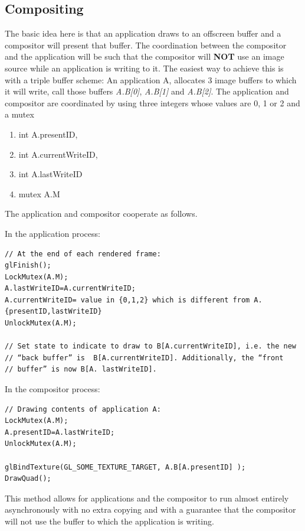 \documentclass[a4paper,11pt]{article}
\begin{document}
\subsection{Compositing}
\begin{indenter}{2cm}

The basic idea here is that an application draws to an offscreen buffer and a compositor will present that buffer. The coordination between the compositor and the application will be such that the compositor will \textbf{NOT} use an image source while an application is writing to it. The easiest way to achieve this is with a triple buffer scheme: An application A, allocates 3 image buffers to which it will write, call those buffers \textit{A.B[0]}, \textit{A.B[1]} and \textit{A.B[2]}. The application and compositor are coordinated by using three integers whose values are 0, 1 or 2 and a mutex
\begin{enumerate}
\item int A.presentID, 
\item int A.currentWriteID, 
\item int A.lastWriteID
\item mutex A.M
\end{enumerate}

The application and compositor cooperate as follows.

In the application process:
\begin{verbatim}
// At the end of each rendered frame:
glFinish();
LockMutex(A.M);
A.lastWriteID=A.currentWriteID;
A.currentWriteID= value in {0,1,2} which is different from A.{presentID,lastWriteID}
UnlockMutex(A.M);

// Set state to indicate to draw to B[A.currentWriteID], i.e. the new 
// “back buffer” is  B[A.currentWriteID]. Additionally, the “front 
// buffer” is now B[A. lastWriteID].
\end{verbatim}

In the compositor process:
\begin{verbatim}
// Drawing contents of application A:
LockMutex(A.M);
A.presentID=A.lastWriteID;
UnlockMutex(A.M);

glBindTexture(GL_SOME_TEXTURE_TARGET, A.B[A.presentID] );
DrawQuad();
\end{verbatim}
	
This method allows for applications and the compositor to run almost entirely asynchronously with no extra copying and with a guarantee that the compositor will not use the buffer to which the application is writing. 

\end{indenter}
\end{document}
